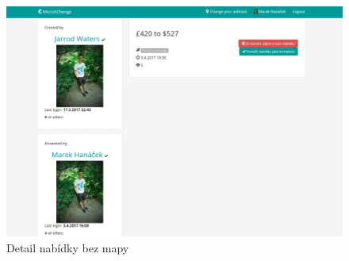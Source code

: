 \begin{figure}[h]
    \centering
    \includegraphics[width=1.0\textwidth]{media/tur/offer-detail-no-map.png}
    \caption{Detail nabídky bez mapy}
    \label{fig:tur:offer-detail-no-map}
\end{figure}